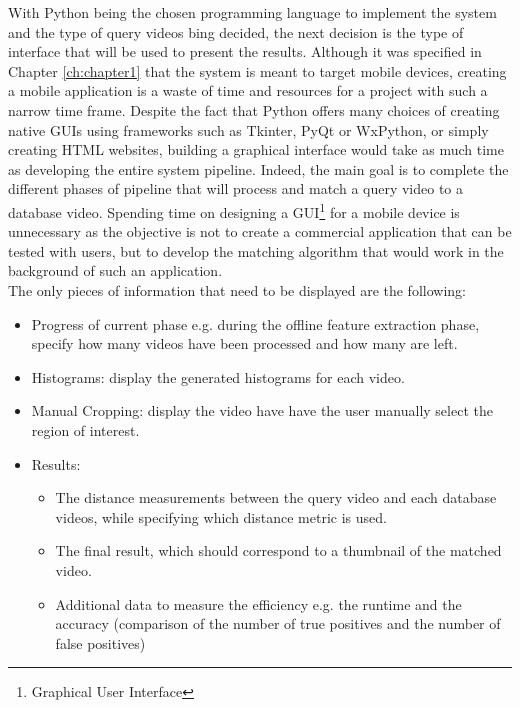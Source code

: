 With Python being the chosen programming language to implement the system and the type of query videos bing decided, the next decision is the type of interface that will be used to present the results. Although it was specified in Chapter \ref{ch:chapter1} that the system is meant to target mobile devices, creating a mobile application is a waste of time and resources for a project with such a narrow time frame. Despite the fact that Python offers many choices of creating native GUIs using frameworks such as Tkinter, PyQt or WxPython, or simply creating HTML websites, building a graphical interface would take as much time as developing the entire system pipeline. Indeed, the main goal is to complete the different phases of pipeline that will process and match a query video to a database video. Spending time on designing a GUI\footnote{Graphical User Interface} for a mobile device is unnecessary as the objective is not to create a commercial application that can be tested with users, but to develop the matching algorithm that would work in the background of such an application.\\

The only pieces of information that need to be displayed are the following:
\begin{itemize}
    \item Progress of current phase e.g. during the offline feature extraction phase, specify how many videos have been processed and how many are left.
    \item Histograms: display the generated histograms for each video.
    \item Manual Cropping: display the video have have the user manually select the region of interest.
    \item Results:
    \begin{itemize}
        \item The distance measurements between the query video and each database videos, while specifying which distance metric is used.
        \item The final result, which should correspond to a thumbnail of the matched video.
        \item Additional data to measure the efficiency e.g. the runtime and the accuracy (comparison of the number of true positives and the number of false positives)
    \end{itemize}
\end{itemize}

